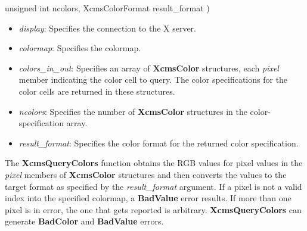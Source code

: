\documentclass{report}
\begin{document}
\begin{itemize}
\begin{cppcode}
                    unsigned int ncolors,
                    XcmsColorFormat result_format
                )
            \end{cppcode}
            \bigbreak \noindent
            \begin{itemize}
                \item \textit{display}: Specifies the connection to the X server.
                \item \textit{colormap}: Specifies the colormap.
                \item \textit{colors\_in\_out}: Specifies an array of \textbf{XcmsColor} structures, each \textit{pixel} member indicating the color cell to query. The color specifications for the color cells are returned in these structures.
                \item \textit{ncolors}: Specifies the number of \textbf{XcmsColor} structures in the color-specification array.
                \item \textit{result\_format}: Specifies the color format for the returned color specification.
            \end{itemize}
            \noindent
            The \textbf{XcmsQueryColors} function obtains the RGB values for pixel values in the \textit{pixel} members of \textbf{XcmsColor} structures and then converts the values to the target format as specified by the \textit{result\_format} argument.
            \bigbreak \noindent
            If a pixel is not a valid index into the specified colormap, a \textbf{BadValue} error results. If more than one pixel is in error, the one that gets reported is arbitrary.
            \bigbreak \noindent
            \textbf{XcmsQueryColors} can generate \textbf{BadColor} and \textbf{BadValue} errors.

    \end{itemize}
\end{document}
